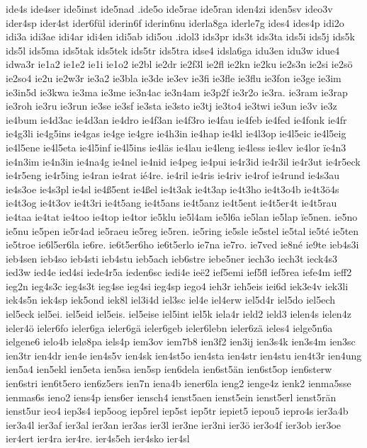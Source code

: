 {{ide4s
ide4ser
ide5inst
ide5nad
.ide5o
ide5rae
ide5ran
iden4zi
iden5sv
ideo3v
ider4sp
ider4st
ider6fül
iderin6f
iderin6nu
iderla8ga
iderle7g
ides4
ides4p
idi2o
idi3a
idi3ae
idi4ar
idi4en
idi5ab
idi5ou
.idol3
ids3pr
ids3t
ids3ta
ids5i
ids5j
ids5k
ids5l
ids5ma
ids5tak
ids5tek
ids5tr
ids5tra
idse4
idsla6ga
idu3en
idu3w
idue4
idwa3r
ie1a2
ie1e2
ie1i
ie1o2
ie2bl
ie2dr
ie2f3l
ie2fl
ie2kn
ie2ku
ie2s3n
ie2si
ie2sö
ie2so4
ie2u
ie2w3r
ie3a2
ie3bla
ie3de
ie3ev
ie3fi
ie3fle
ie3flu
ie3fon
ie3ge
ie3im
ie3in5d
ie3kwa
ie3ma
ie3me
ie3n4ac
ie3n4am
ie3p2f
ie3r2o
ie3ra.
ie3ram
ie3rap
ie3roh
ie3ru
ie3run
ie3se
ie3sf
ie3sta
ie3sto
ie3tj
ie3to4
ie3twi
ie3un
ie3v
ie3z
ie4bum
ie4d3ac
ie4d3an
ie4dro
ie4f3an
ie4f3ro
ie4fau
ie4feb
ie4fed
ie4fonk
ie4fr
ie4g3li
ie4g5ins
ie4gas
ie4ge
ie4gre
ie4h3in
ie4hap
ie4kl
ie4l3op
ie4l5eic
ie4l5eig
ie4l5ene
ie4l5eta
ie4l5inf
ie4l5ins
ie4läs
ie4lau
ie4leng
ie4less
ie4lev
ie4lor
ïe4n3
ie4n3im
ie4n3in
ie4na4g
ie4nel
ie4nid
ie4peg
ie4pui
ie4r3id
ie4r3il
ie4r3ut
ie4r5eck
ie4r5eng
ie4r5ing
ie4ran
ie4rat
ié4re.
ie4ril
ie4ris
ie4riv
ie4rof
ie4rund
ie4s3au
ie4s3oe
ie4s3pl
ie4sl
ie4ß5ent
ie4ßel
ie4t3ak
ie4t3ap
ie4t3ho
ie4t3o4b
ie4t3ö4s
ie4t3og
ie4t3ov
ie4t3ri
ie4t5ang
ie4t5ans
ie4t5anz
ie4t5ent
ie4t5er4t
ie4t5rau
ie4taa
ie4tat
ie4too
ie4top
ie4tor
ie5klu
ie5l4am
ie5l6a
ie5lan
ie5lap
ïe5nen.
ie5no
ie5nu
ie5pen
ie5r4ad
ie5raeu
ie5reg
ie5ren.
ie5ring
ie5sle
ie5stel
ie5tal
ie5té
ie5ten
ie5troe
ie6l5er6la
ie6re.
ie6t5er6ho
ie6t5erlo
ie7na
ie7ro.
ie7ved
ie8né
ie9te
ieb4s3i
ieb4sen
ieb4so
ieb4sti
ieb4stu
ieb5ach
ieb6stre
iebe5ner
iech3o
iech3t
ieck4s3
ied3w
ied4e
ied4si
iede4r5a
ieden6sc
iedi4e
ieë2
ief5emi
ief5fl
ief5rea
iefe4m
ieff2
ieg2n
ieg4s3c
ieg4s3t
ieg4se
ieg4si
ieg4sp
iego4
ieh3r
ieh5eis
iei6d
iek3e4v
iek3li
iek4s5n
iek4sp
iek5ond
iek8l
iel3i4d
iel3sc
iel4e
iel4erw
iel5d4r
iel5do
iel5ech
iel5eck
iel5ei.
iel5eid
iel5eis.
iel5eise
iel5int
iel5k
iela4r
ield2
ield3
ielen4s
ielen4z
ieler4ö
ieler6fo
ieler6ga
ieler6gä
ieler6geb
ieler6lebn
ieler6zä
ieles4
ielge5n6a
ielgene6
ielo4b
ielø8pa
iels4p
iem3ov
iem7b8
ien3f2
ien3ij
ien3s4k
ien3s4m
ien3sc
ien3tr
ien4dr
ien4e
ien4s5v
ien4sk
ien4st5o
ien4sta
ien4str
ien4stu
ien4t3r
ien4ung
ien5a4
ien5ekl
ien5eta
ien5sa
ien5sp
ien6dela
ien6st5än
ien6st5op
ien6sterw
ien6stri
ien6t5ero
ien6z5ers
ien7n
iena4b
iener6la
ieng2
ienge4z
ienk2
ienma5sse
ienmas6s
ieno2
iens4p
iens6er
iensch4
ienst5aen
ienst5ein
ienst5erl
ienst5rän
ienst5ur
ieo4
iep3s4
iep5oog
iep5rel
iep5st
iep5tr
iepiet5
iepou5
iepro4s
ier3a4b
ier3a4l
ier3af
ier3al
ier3an
ier3as
ier3l
ier3ne
ier3ni
ier3ö
ier3o4f
ier3ob
ier3oe
ier4ert
ier4ra
ier4re.
ier4s5eh
ier4sko
ier4sl
}}
